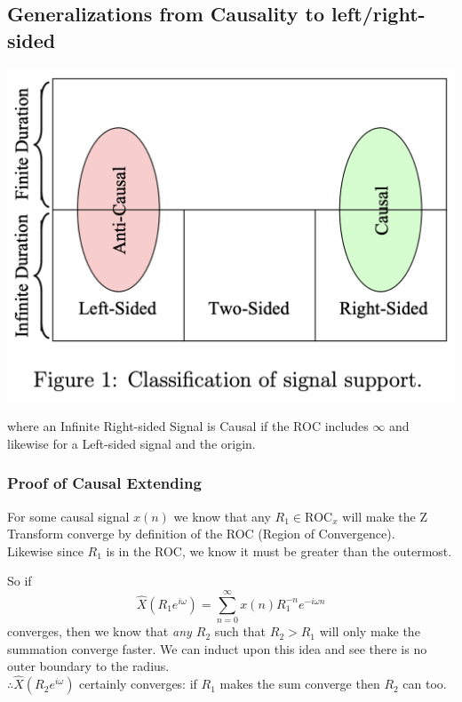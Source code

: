 \subsection{ Generalizations from Causality to left/right-sided}
\begin{center}
    \includegraphics[scale=0.25]{lectures/wk12/img/signal_classification.png}
\end{center}

where an Infinite Right-sided Signal is Causal if the ROC includes $\infty$ and likewise for a Left-sided signal and the origin.

\subsubsection{Proof of Causal Extending}
For some causal signal $x(n)$ we know that any $R_1\in\text{ROC}_x$ will make the Z Transform converge by definition of the ROC (Region of Convergence). \\
Likewise since $R_1$ is in the ROC, we know it must be greater than the outermost.

So if
\[
    \hat X(R_1 e^{i\omega}) = \sum_{n=0}^\infty x(n) R_1^{-n} e^{-i\omega n}
\]
converges, then we know that \textit{any $R_2$} such that $R_2 > R_1$ will only make the summation converge faster. We can induct upon this idea and see there is no outer boundary to the radius.\\
$\therefore \hat X(R_2 e^{i\omega})$ certainly converges: if $R_1$ makes the sum converge then $R_2$ can too.

